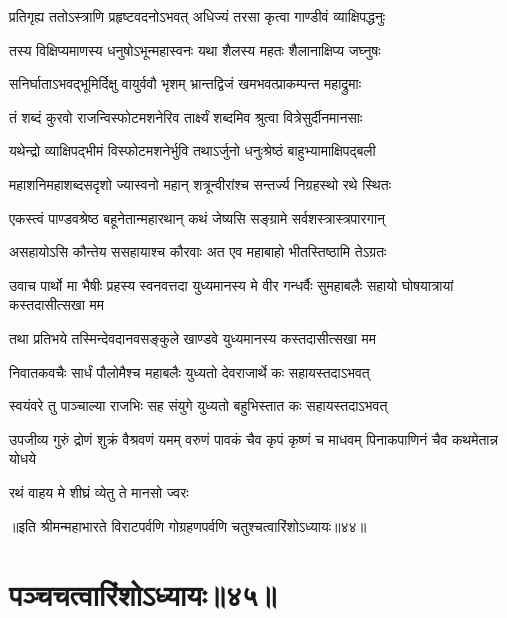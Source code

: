 \twolineshloka
{प्रतिगृह्य ततोऽस्त्राणि प्रहृष्टवदनोऽभवत्}
{अधिज्यं तरसा कृत्वा गाण्डीवं व्याक्षिपद्धनुः}


\twolineshloka
{तस्य विक्षिप्यमाणस्य धनुषोऽभून्महास्वनः}
{यथा शैलस्य महतः शैलानाक्षिप्य जघ्नुषः}


\twolineshloka
{सनिर्घाताऽभवद्भूमिर्दिक्षु वायुर्ववौ भृशम्}
{भ्रान्तद्विजं खमभवत्प्राकम्पन्त महाद्रुमाः}


\twolineshloka
{तं शब्दं कुरवो राजन्विस्फोटमशनेरिव}
{तार्क्ष्यं शब्दमिव श्रुत्वा वित्रेसुर्दीनमानसाः}


\twolineshloka
{यथेन्द्रो व्याक्षिपद्भीमं विस्फोटमशनेर्भुवि}
{तथाऽर्जुनो धनुःश्रेष्ठं बाहुभ्यामाक्षिपद्बली}


\twolineshloka
{महाशनिमहाशब्दसदृशो ज्यास्वनो महान्}
{शत्रून्वीरांश्च सन्तर्ज्य निग्रहस्थो रथे स्थितः}




\twolineshloka
{एकस्त्वं पाण्डवश्रेष्ठ बहूनेतान्महारथान्}
{कथं जेष्यसि सङ्ग्रामे सर्वशस्त्रास्त्रपारगान्}


\twolineshloka
{असहायोऽसि कौन्तेय ससहायाश्च कौरवाः}
{अत एव महाबाहो भीतस्तिष्ठामि तेऽग्रतः}



\onelineshloka
{उवाच पार्थो मा भैषीः प्रहस्य स्वनवत्तदा}
\twolineshloka
{युध्यमानस्य मे वीर गन्धर्वैः सुमहाबलैः}
{सहायो घोषयात्रायां कस्तदासीत्सखा मम}


\twolineshloka
{तथा प्रतिभये तस्मिन्देवदानवसङ्कुले}
{खाण्डवे युध्यमानस्य कस्तदासीत्सखा मम}


\twolineshloka
{निवातकवचैः सार्धं पौलोमैश्च महाबलैः}
{युध्यतो देवराजार्थे कः सहायस्तदाऽभवत्}


\twolineshloka
{स्वयंवरे तु पाञ्चाल्या राजभिः सह संयुगे}
{युध्यतो बहुभिस्तात कः सहायस्तदाऽभवत्}


\threelineshloka
{उपजीव्य गुरुं द्रोणं शुक्रं वैश्रवणं यमम्}
{वरुणं पावकं चैव कृपं कृष्णं च माधवम्}
{पिनाकपाणिनं चैव कथमेतान्न योधये}


\onelineshloka
{रथं वाहय मे शीघ्रं व्येतु ते मानसो ज्वरः}


॥इति श्रीमन्महाभारते विराटपर्वणि गोग्रहणपर्वणि चतुश्चत्वारिंशोऽध्यायः॥४४॥

\chapter{पञ्चचत्वारिंशोऽध्यायः॥४५॥}

